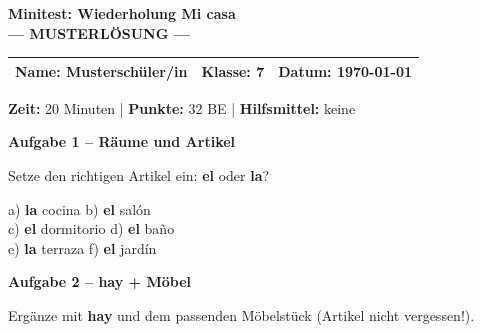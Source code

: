 \documentclass[11pt, a4paper]{article}
\newcommand{\fachfarbe}{spanisch}
\newcommand{\thema}{Minitest: Wiederholung Mi casa}
\newcommand{\klasse}{7}
\newcommand{\maxpunkte}{32}
\newcommand{\zeit}{20 Minuten}
\newcommand{\datum}{\today}
\newcommand{\punktebox}[1]{\hfill\fbox{\small \_/#1}}
\newcommand{\lsg}[1]{\textcolor{loesung}{\textbf{#1}}}
\newenvironment{aufgabe}[1]{%
    \needspace{5\baselineskip}%
    \nopagebreak[4]%
    \vspace{10pt}
    \noindent\textbf{\textcolor{\fachfarbe}{Aufgabe #1}}
    \nopagebreak[4]%
    \vspace{5pt}
    \nopagebreak[4]%
    \begin{list}{}{\leftmargin=0pt}
    \item[]
}{%
    \end{list}
}
\newcommand{\es}[1]{\textcolor{\fachfarbe}{\textbf{#1}}}
\begin{document}

\begin{center}
    {\Large\bfseries\textcolor{\fachfarbe}{\thema}}\\[0.3em]
    {\large\textcolor{loesung}{\textbf{--- MUSTERLÖSUNG ---}}}
\end{center}

\vspace{5pt}

\noindent
\begin{tabularx}{\textwidth}{|X|X|X|}
\hline
\textbf{Name:} \lsg{Musterschüler/in} &
\textbf{Klasse:} \klasse &
\textbf{Datum:} \datum \\
\hline
\end{tabularx}

\vspace{10pt}

\begin{infobox}
\textbf{Zeit:} \zeit{} | \textbf{Punkte:} \maxpunkte{} BE | \textbf{Hilfsmittel:} keine
\end{infobox}

\vspace{15pt}


\begin{aufgabe}{1 -- Räume und Artikel}
Setze den richtigen Artikel ein: \es{el} oder \es{la}? \punktebox{6}
\end{aufgabe}

\noindent
a) \lsg{la} cocina \hfill
b) \lsg{el} salón \\[0.8em]
c) \lsg{el} dormitorio \hfill
d) \lsg{el} baño \\[0.8em]
e) \lsg{la} terraza \hfill
f) \lsg{el} jardín \\

\vspace{15pt}


\begin{aufgabe}{2 -- hay + Möbel}
Ergänze mit \es{hay} und dem passenden Möbelstück (Artikel nicht vergessen!). \punktebox{8}
\end{aufgabe}
\end{document}
